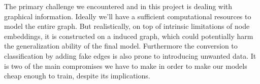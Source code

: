 \documentclass[a4paper,11pt]{article}
\begin{document}
The primary challenge we encountered and in this project is dealing with graphical information. Ideally we'll have a sufficient computational resources to model the entire graph. But realistically, on top of intrinsic limitations of node embeddings, it is constructed on a induced graph, which could potentially harm the generalization ability of the final model. Furthermore the conversion to classification by adding fake edges is also prone to introducing unwanted data. It is two of the main compromises we have to make in order to make our models cheap enough to train, despite its implications.

\printbibliography
\end{document}
